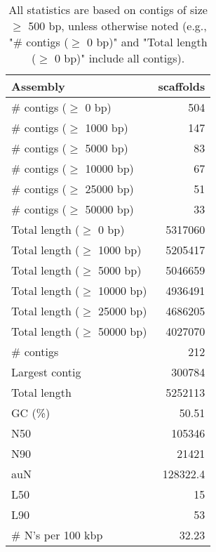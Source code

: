\documentclass[12pt,a4paper]{article}
\begin{document}
\begin{table}[ht]
\begin{center}
\caption{All statistics are based on contigs of size $\geq$ 500 bp, unless otherwise noted (e.g., "\# contigs ($\geq$ 0 bp)" and "Total length ($\geq$ 0 bp)" include all contigs).}
\begin{tabular}{|l*{1}{|r}|}
\hline
Assembly & scaffolds \\ \hline
\# contigs ($\geq$ 0 bp) & 504 \\ \hline
\# contigs ($\geq$ 1000 bp) & 147 \\ \hline
\# contigs ($\geq$ 5000 bp) & 83 \\ \hline
\# contigs ($\geq$ 10000 bp) & 67 \\ \hline
\# contigs ($\geq$ 25000 bp) & 51 \\ \hline
\# contigs ($\geq$ 50000 bp) & 33 \\ \hline
Total length ($\geq$ 0 bp) & 5317060 \\ \hline
Total length ($\geq$ 1000 bp) & 5205417 \\ \hline
Total length ($\geq$ 5000 bp) & 5046659 \\ \hline
Total length ($\geq$ 10000 bp) & 4936491 \\ \hline
Total length ($\geq$ 25000 bp) & 4686205 \\ \hline
Total length ($\geq$ 50000 bp) & 4027070 \\ \hline
\# contigs & 212 \\ \hline
Largest contig & 300784 \\ \hline
Total length & 5252113 \\ \hline
GC (\%) & 50.51 \\ \hline
N50 & 105346 \\ \hline
N90 & 21421 \\ \hline
auN & 128322.4 \\ \hline
L50 & 15 \\ \hline
L90 & 53 \\ \hline
\# N's per 100 kbp & 32.23 \\ \hline
\end{tabular}
\end{center}
\end{table}
\end{document}
